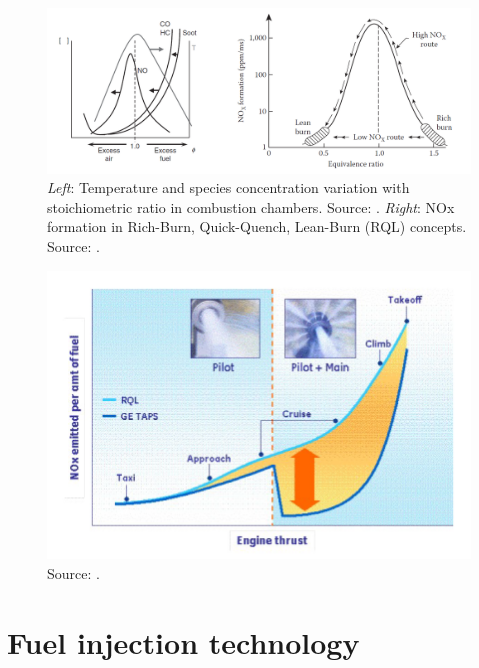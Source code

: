 \begin{figure}[h!]
	\centering
	\includegraphics[scale=0.7]{./part0_intro/NOX_motivation_and_RQL}
	\caption{\textsl{Left}: Temperature and species concentration variation with stoichiometric ratio in combustion chambers. Source: . \textsl{Right}: NOx formation in Rich-Burn, Quick-Quench, Lean-Burn (RQL) concepts. Source: .}
	\label{fig:NOX_motivation_and_RQL}
\end{figure}







\begin{figure}[h!]
	\centering
	\includegraphics[scale=0.7]{./part0_intro/foust_RQL_vs_TAPS}
	\caption{Source: .}
	\label{fig:foust_RQL_vs_TAPS}
\end{figure}







\section{Fuel injection technology}

